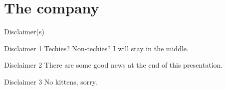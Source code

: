 \documentclass[xcolor=svgnames]{beamer}
\begin{document}

\section{The company}

    \begin{frame}{Disclaimer(s)}
        \pause
        \begin{block}{Disclaimer 1}
            Techies? Non-techies? I will stay in the middle.
        \end{block}
        \pause
        \vspace{0.05\textheight}
        \begin{block}{Disclaimer 2}
            There are some good news at the end of this presentation.
        \end{block}
        \pause
        \vspace{0.05\textheight}
        \begin{block}{Disclaimer 3}
            No kittens, sorry.
        \end{block}
    \end{frame}
\end{document}
